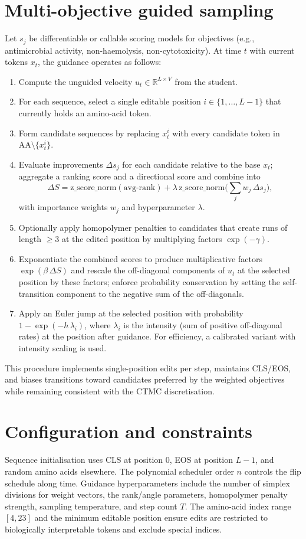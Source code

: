 \section*{Multi-objective guided sampling}
Let \(s_j\) be differentiable or callable scoring models for objectives (e.g., antimicrobial activity, non-haemolysis, non-cytotoxicity). At time \(t\) with current tokens \(x_t\), the guidance operates as follows:
\begin{enumerate}
  \item Compute the unguided velocity \(u_t\in\mathbb{R}^{L\times V}\) from the student.
  \item For each sequence, select a single editable position \(i\in\{1,\dots,L-1\}\) that currently holds an amino-acid token.
  \item Form candidate sequences by replacing \(x_t^i\) with every candidate token in \(\mathrm{AA}\setminus\{x_t^i\}\).
  \item Evaluate improvements \(\Delta s_j\) for each candidate relative to the base \(x_t\); aggregate a ranking score and a directional score and combine into
  \[\Delta S = \mathrm{z\_score\_norm}(\text{avg-rank}) + \lambda\,\mathrm{z\_score\_norm}\Big(\sum_j w_j\,\Delta s_j\Big),\]
  with importance weights \(w_j\) and hyperparameter \(\lambda\).
  \item Optionally apply homopolymer penalties to candidates that create runs of length \(\ge 3\) at the edited position by multiplying factors \(\exp(-\gamma)\).
  \item Exponentiate the combined scores to produce multiplicative factors \(\exp(\beta\,\Delta S)\) and rescale the off-diagonal components of \(u_t\) at the selected position by these factors; enforce probability conservation by setting the self-transition component to the negative sum of the off-diagonals.
  \item Apply an Euler jump at the selected position with probability \(1-\exp(-h\,\lambda_i)\), where \(\lambda_i\) is the intensity (sum of positive off-diagonal rates) at the position after guidance. For efficiency, a calibrated variant with intensity scaling is used.
\end{enumerate}
This procedure implements single-position edits per step, maintains CLS/EOS, and biases transitions toward candidates preferred by the weighted objectives while remaining consistent with the CTMC discretisation.

\section*{Configuration and constraints}
Sequence initialisation uses CLS at position 0, EOS at position \(L-1\), and random amino acids elsewhere. The polynomial scheduler order \(n\) controls the flip schedule along time. Guidance hyperparameters include the number of simplex divisions for weight vectors, the rank/angle parameters, homopolymer penalty strength, sampling temperature, and step count \(T\). The amino-acid index range \([4,23]\) and the minimum editable position ensure edits are restricted to biologically interpretable tokens and exclude special indices.

